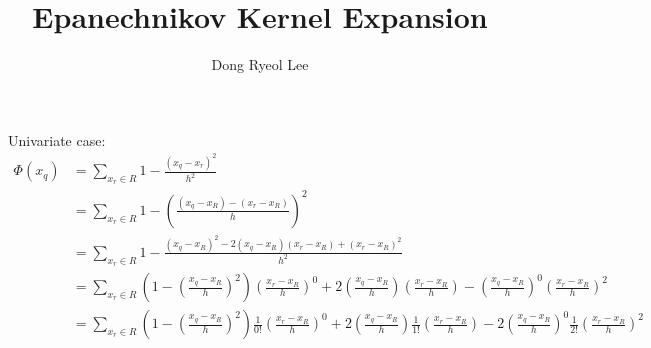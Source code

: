 \documentclass[letterpaper,12pt]{article}
\author{Dong Ryeol Lee}
\title{Epanechnikov Kernel Expansion}
\begin{document}
\maketitle

Univariate case:
\begin{align*}
\Phi(x_q) &= \sum\limits_{x_r \in R} 1 - \frac{(x_q - x_r)^2}{h^2}\\
&= \sum\limits_{x_r \in R} 1 - \left( \frac{(x_q - x_R) - (x_r -
x_R)}{h} \right)^2\\ &= \sum\limits_{x_r \in R} 1 - \frac{(x_q -
x_R)^2 - 2(x_q - x_R)(x_r - x_R) + (x_r - x_R)^2}{h^2}\\ &=
\sum\limits_{x_r \in R} \left( 1 - \left( \frac{x_q - x_R}{h}
\right)^2 \right) \left( \frac{x_r - x_R}{h} \right)^0+ 2 \left(
\frac{x_q - x_R }{h} \right) \left( \frac{x_r - x_R}{h}\right) -
\left( \frac{x_q - x_R}{h} \right)^0 \left( \frac{x_r - x_R}{h}
\right)^2\\ &= \sum\limits_{x_r \in R} \left( 1 - \left( \frac{x_q -
x_R}{h} \right)^2 \right) \frac{1}{0!}\left( \frac{x_r - x_R}{h}
\right)^0+ 2 \left( \frac{x_q - x_R }{h} \right) \frac{1}{1!} \left(
\frac{x_r - x_R}{h}\right) - 2 \left( \frac{x_q - x_R}{h} \right)^0
\frac{1}{2!} \left( \frac{x_r - x_R}{h} \right)^2\\
\end{align*}
\end{document}
